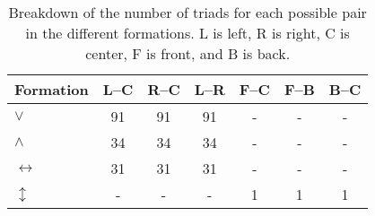 \begin{table}
\centering
\caption{Breakdown of the number of triads for each possible pair in the different formations. L is left, R is right, C is center, F is front, and B is back.}
\label{tab:counts_triads_pairs}
\begin{tabular}{lcccccc}
\toprule
Formation & L--C & R--C & L--R & F--C & F--B & B--C \\
\midrule
$\vee$ & 91 & 91 & 91 & - & - & - \\
$\wedge$ & 34 & 34 & 34 & - & - & - \\
$\longleftrightarrow$ & 31 & 31 & 31 & - & - & - \\
$\updownarrow$ & - & - & - & 1 & 1 & 1 \\
\bottomrule
\end{tabular}
\end{table}
